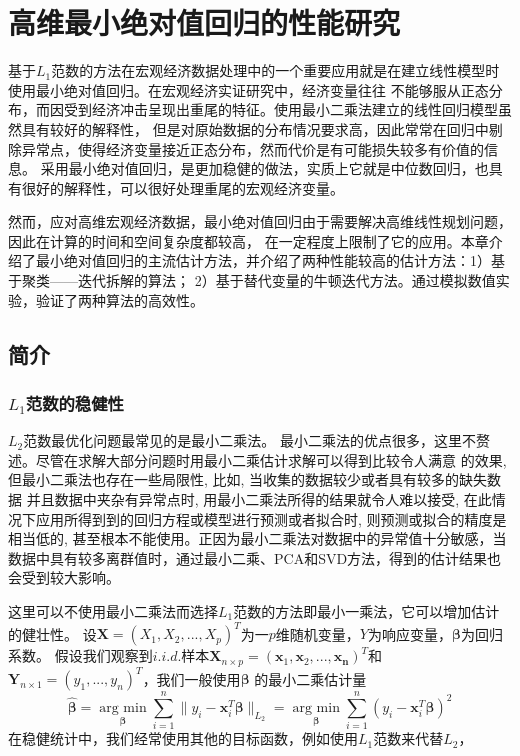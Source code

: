 \section{高维最小绝对值回归的性能研究}
基于$L_1$范数的方法在宏观经济数据处理中的一个重要应用就是在建立线性模型时使用最小绝对值回归。在宏观经济实证研究中，经济变量往往
不能够服从正态分布，而因受到经济冲击呈现出重尾的特征。使用最小二乘法建立的线性回归模型虽然具有较好的解释性，
但是对原始数据的分布情况要求高，因此常常在回归中剔除异常点，使得经济变量接近正态分布，然而代价是有可能损失较多有价值的信息。
采用最小绝对值回归，是更加稳健的做法，实质上它就是中位数回归，也具有很好的解释性，可以很好处理重尾的宏观经济变量。

然而，应对高维宏观经济数据，最小绝对值回归由于需要解决高维线性规划问题，因此在计算的时间和空间复杂度都较高，
在一定程度上限制了它的应用。本章介绍了最小绝对值回归的主流估计方法，并介绍了两种性能较高的估计方法：1）基于聚类——迭代拆解的算法；
2）基于替代变量的牛顿迭代方法。通过模拟数值实验，验证了两种算法的高效性。

\subsection{简介}
\subsubsection{$L_1$范数的稳健性}

$L_2$范数最优化问题最常见的是最小二乘法。
最小二乘法的优点很多，这里不赘述。尽管在求解大部分问题时用最小二乘估计求解可以得到比较令人满意
的效果, 但最小二乘法也存在一些局限性, 比如, 当收集的数据较少或者具有较多的缺失数据
并且数据中夹杂有异常点时, 用最小二乘法所得的结果就令人难以接受, 在此情况下应用所得到到的回归方程或模型进行预测或者拟合时, 
则预测或拟合的精度是相当低的, 甚至根本不能使用。正因为最小二乘法对数据中的异常值十分敏感，当数据中具有较多离群值时，通过最小二乘、PCA和SVD方法，得到的估计结果也会受到较大影响。

这里可以不使用最小二乘法而选择$L_1$范数的方法即最小一乘法，它可以增加估计的健壮性。
设$\bm{X} = (X_1, X_2, ..., X_p)^T$为一$p$维随机变量，$Y$为响应变量，$\bm{\beta}$为回归系数。
假设我们观察到$i.i.d. $样本$\bm{X}_{n\times p} = (\bm{x}_1, \bm{x}_2, ..., \bm{x_n})^T$和$\bm{Y}_{n\times1}=
(y_1, ..., y_n)^T$，我们一般使用$\bm{\beta}$
的最小二乘估计量
\begin{equation}\label{l2loss}
\hat{\bm{\beta}} = \underset{\bm{\beta}}{\operatorname{arg\ min}} \sum_{i=1}^n\|y_i - \bm{x}^T_i\bm{\beta}\|_{L_2}
=\underset{\bm{\beta}}{\operatorname{arg\ min}} \sum_{i=1}^n(y_i - \bm{x}^T_i\bm{\beta})^2
\end{equation}
在稳健统计中，我们经常使用其他的目标函数，例如使用$L_1$范数来代替$L_2$，

